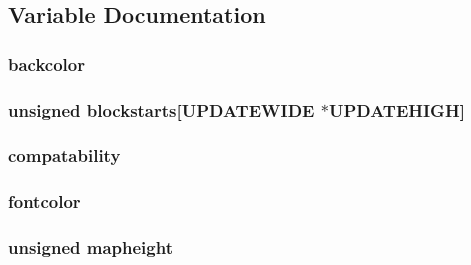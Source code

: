 \subsection{Variable Documentation}
\hypertarget{ID__HEADS_8H_ae05eaca54ea12a430673a8732425a748}{
\subsubsection[{backcolor}]{ {\bf backcolor}}}
\label{ID__HEADS_8H_ae05eaca54ea12a430673a8732425a748}
\hypertarget{ID__HEADS_8H_a55e89f395ced8a12eba2634336292526}{
\subsubsection[{blockstarts}]{\setlength{\rightskip}{0pt plus 5cm}unsigned {\bf blockstarts}\mbox{[}UPDATEWIDE $\ast$UPDATEHIGH\mbox{]}}}
\label{ID__HEADS_8H_a55e89f395ced8a12eba2634336292526}
\hypertarget{ID__HEADS_8H_ac82e52209129dcc9cad9d8c8d6b2a77a}{
\subsubsection[{compatability}]{ {\bf compatability}}}
\label{ID__HEADS_8H_ac82e52209129dcc9cad9d8c8d6b2a77a}
\hypertarget{ID__HEADS_8H_a37dfad01117cac8636922fd4d030131b}{
\subsubsection[{fontcolor}]{ {\bf fontcolor}}}
\label{ID__HEADS_8H_a37dfad01117cac8636922fd4d030131b}
\hypertarget{ID__HEADS_8H_aa57a71a17124e3d1995584f7b4fe1ca0}{
\subsubsection[{mapheight}]{\setlength{\rightskip}{0pt plus 5cm}unsigned {\bf mapheight}}}
